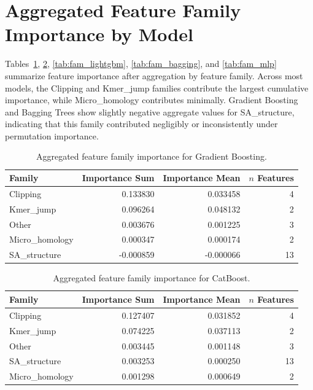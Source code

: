 \FloatBarrier

\section{Aggregated Feature Family Importance by Model}
\label{app:family_importance_models}

Tables~\ref{tab:fam_gb}, \ref{tab:fam_catboost}, \ref{tab:fam_lightgbm}, \ref{tab:fam_bagging}, and \ref{tab:fam_mlp} summarize feature importance after aggregation by feature family. Across most models, the Clipping and Kmer\_jump families contribute the largest cumulative importance, while Micro\_homology contributes minimally. Gradient Boosting and Bagging Trees show slightly negative aggregate values for SA\_structure, indicating that this family contributed negligibly or inconsistently under permutation importance.

\begin{table}[H]
\centering
\caption{Aggregated feature family importance for Gradient Boosting.}
\label{tab:fam_gb}
\begin{tabular}{lrrr}
\toprule
Family & Importance Sum & Importance Mean & $n$ Features \\
\midrule
Clipping & 0.133830 & 0.033458 & 4 \\
Kmer\_jump & 0.096264 & 0.048132 & 2 \\
Other & 0.003676 & 0.001225 & 3 \\
Micro\_homology & 0.000347 & 0.000174 & 2 \\
SA\_structure & -0.000859 & -0.000066 & 13 \\
\bottomrule
\end{tabular}
\end{table}

\begin{table}[H]
\centering
\caption{Aggregated feature family importance for CatBoost.}
\label{tab:fam_catboost}
\begin{tabular}{lrrr}
\toprule
Family & Importance Sum & Importance Mean & $n$ Features \\
\midrule
Clipping & 0.127407 & 0.031852 & 4 \\
Kmer\_jump & 0.074225 & 0.037113 & 2 \\
Other & 0.003445 & 0.001148 & 3 \\
SA\_structure & 0.003253 & 0.000250 & 13 \\
Micro\_homology & 0.001298 & 0.000649 & 2 \\
\bottomrule
\end{tabular}
\end{table}


